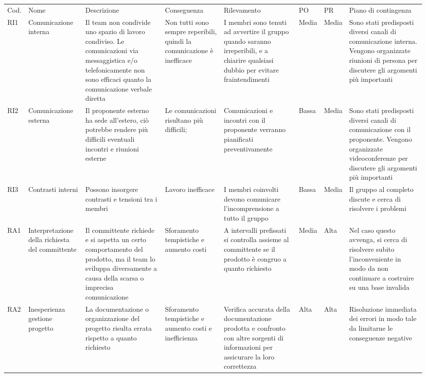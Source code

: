 \begin{landscape}
\begin{table}[h]
\begin{center}
\begin{tabular}{p{0.6cm}|p{2.2cm}|p{4cm}|p{2cm}|p{4cm}|p{0.9cm}|p{0.8cm}|p{4cm}}
Cod. & Nome & Descrizione & Conseguenza & Rilevamento & PO & PR & Piano di contingenza\\
RI1 & Comunicazione interna & Il team non condivide uno spazio di lavoro condiviso. Le comunicazioni via messaggistica e/o telefonicamente non sono efficaci quanto la comunicazione verbale diretta & Non tutti sono sempre reperibili, quindi la comunicazione è inefficace & I membri sono tenuti ad avvertire il gruppo quando saranno irreperibili, e a chiarire qualsiasi dubbio per evitare fraintendimenti & Media & Media & Sono stati predisposti diversi canali di comunicazione interna. Vengono organizzate riunioni di persona per discutere gli argomenti più importanti\\
RI2 & Comunicazione esterna & Il proponente esterno ha sede all’estero, ciò potrebbe rendere più difficili eventuali incontri e riunioni esterne & Le comunicazioni risultano più difficili; & Comunicazioni e incontri con il proponente verranno pianificati preventivamente & Bassa & Media & Sono stati predisposti diversi canali di comunicazione con il proponente. Vengono organizzate videoconferenze per discutere gli argomenti più importanti \\
RI3 & Contrasti interni     & Possono insorgere contrasti e tensioni tra i membri                                                                                                                  & Lavoro inefficace                                                      & I membri coinvolti devono comunicare l’incomprensione a tutto il gruppo                                                            & Bassa & Media & Il gruppo al completo discute e cerca di risolvere i problemi  \\
RA1 & Interpretazione della richiesta del committente & Il committente richiede e si aspetta un certo comportamento del prodotto, ma il team lo sviluppa diversamente a causa della scarsa o imprecisa comunicazione & Sforamento tempistiche e aumento costi & A intervalli prefissati si controlla assieme al committente se il prodotto è congruo a quanto richiesto & Media & Alta & Nel caso questo avvenga, si cerca di risolvere subito l’inconveniente in modo da non continuare a costruire su una base invalida \\
RA2 & Inesperienza gestione progetto & La documentazione o organizzazione del progetto risulta errata rispetto a quanto richiesto & Sforamento tempistiche e aumento costi e inefficienza & Verifica accurata della documentazione prodotta e confronto con altre sorgenti di informazioni per assicurare la loro correttezza & Alta & Alta & Risoluzione immediata dei errori in modo tale da limitarne le conseguenze negative \\                                                         
\end{tabular}
\end{center}
\end{table}
\end{landscape}
